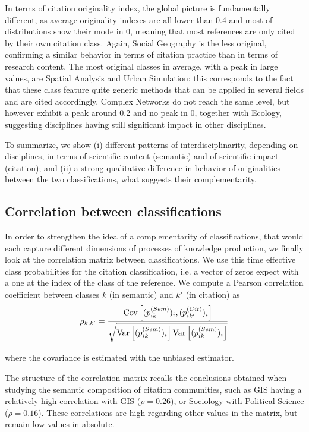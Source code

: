 In terms of citation originality index, the global picture is fundamentally different, as average originality indexes are all lower than 0.4 and most of distributions show their mode in 0, meaning that most references are only cited by their own citation class. Again, Social Geography is the less original, confirming a similar behavior in terms of citation practice than in terms of research content. The most original classes in average, with a peak in large values, are Spatial Analysis and Urban Simulation: this corresponds to the fact that these class feature quite generic methods that can be applied in several fields and are cited accordingly. Complex Networks do not reach the same level, but however exhibit a peak around 0.2 and no peak in 0, together with Ecology, suggesting disciplines having still significant impact in other disciplines.


To summarize, we show (i) different patterns of interdisciplinarity, depending on disciplines, in terms of scientific content (semantic) and of scientific impact (citation); and (ii) a strong qualitative difference in behavior of originalities between the two classifications, what suggests their complementarity.



\subsection*{Correlation between classifications}


In order to strengthen the idea of a complementarity of classifications, that would each capture different dimensions of processes of knowledge production, we finally look at the correlation matrix between classifications. We use this time effective class probabilities for the citation classification, i.e. a vector of zeros expect with a one at the index of the class of the reference. We compute a Pearson correlation coefficient between classes $k$ (in semantic) and $k'$ (in citation) as
\begin{equation}
\rho_{k,k'} = \frac{\operatorname{Cov} \left[ (p^{(Sem)}_{ik})_i , (p^{(Cit)}_{ik'})_i \right]}{\sqrt{\operatorname{Var}\left[(p^{(Sem)}_{ik})_i\right]\operatorname{Var}\left[(p^{(Sem)}_{ik})_i\right]}}
\end{equation}

\noindent where the covariance is estimated with the unbiased estimator.


The structure of the correlation matrix recalls the conclusions obtained when studying the semantic composition of citation communities, such as GIS having a relatively high correlation with GIS ($\rho=0.26$), or Sociology with Political Science ($\rho=0.16$). These correlations are high regarding other values in the matrix, but remain low values in absolute.

